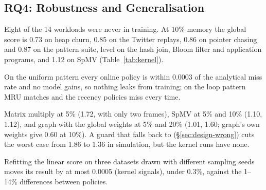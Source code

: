 \begin{figure}[t]
\centering
{}
\caption{}
\label{fig:tradeoff}
\end{figure}

\subsection{RQ4: Robustness and Generalisation}
\label{sec:eval-robust}

 Eight of the 14 workloads were never in
training. At 10\% memory the global score is 0.73 on heap churn, 0.85 on the Twitter
replays, 0.86 on pointer chasing and 0.87 on the pattern suite, level on the hash join,
Bloom filter and application programs, and 1.12 on SpMV (Table~\ref{tab:kernel}).

 On the uniform pattern every online policy is within 0.0003 of
the analytical miss rate and no model gains, so nothing leaks from training; on the loop
pattern MRU matches \belady and the recency policies miss every time.

 Matrix multiply at 5\% (1.72, with only two
frames), SpMV at 5\% and 10\% (1.10, 1.12), and graph with the global weights at 5\% and
20\% (1.01, 1.60; graph's own weights give 0.60 at 10\%). A guard that falls back to
\clock (\S\ref{sec:design-wrong}) cuts the worst case from 1.86 to 1.36 in simulation, but
the kernel runs have none.

 Refitting the linear score on three datasets
drawn with different sampling seeds moves its result by at most 0.0005 (kernel signals),
under 0.3\%, against the 1--14\% differences between policies.


